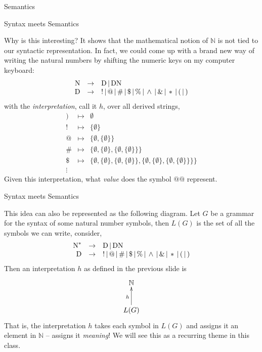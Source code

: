 \documentclass{beamer}
\begin{document}
\begin{frame}{Semantics}

\begin{frame}{Syntax meets Semantics}
\scriptsize

Why is this interesting?  It shows that the mathematical notion of $\mathbb{N}$ is not tied to our syntactic representation.
In fact, we could come up with a brand new way of writing the natural numbers by shifting the numeric keys on my computer keyboard:
\[
\begin{array}{rcl}
\mbox{N} &\rightarrow& \mbox{D} \,|\, \mbox{D}\mbox{N}\\
\mbox{D} &\rightarrow& ! \,|\, @ \,|\, \# \,|\, \$ \,|\, \% \,|\, \wedge \,|\, \& \,|\, * \,|\, ( \,|\, )
\end{array}
\]
with the {\em interpretation}, call it $h$, over all derived strings,
\[
\begin{array}{rcl}
) & \mapsto & \emptyset \\
! & \mapsto & \{\emptyset \} \\
@ & \mapsto & \{ \emptyset , \{\emptyset \} \}\\
\# & \mapsto &\{ \emptyset , \{\emptyset \}, \{ \emptyset , \{\emptyset \} \} \}\\
\$ & \mapsto & \{ \emptyset , \{\emptyset \}, \{ \emptyset , \{\emptyset \} \} , \{ \emptyset , \{\emptyset \}, \{ \emptyset , \{\emptyset \} \} \}\}\\
\vdots
\end{array}
\]
Given this interpretation, what {\em value} does the symbol $@@$ represent.
\end{frame}


\begin{frame}{Syntax meets Semantics}
\small

This idea can also be represented as the following diagram.  Let $G$ be a grammar for the syntax of some natural number symbols,
then $L(G)$ is the set of all the symbols we can write, consider,
{\scriptsize
\[
\begin{array}{rcl}
\mbox{N}^* &\rightarrow& \mbox{D} \,|\, \mbox{D}\mbox{N}\\
\mbox{D} &\rightarrow& ! \,|\, @ \,|\, \# \,|\, \$ \,|\, \% \,|\, \wedge \,|\, \& \,|\, * \,|\, ( \,|\, )
\end{array}
\]
}
Then an interpretation $h$ as defined in the previous slide is
\[
\xymatrix{
\mathbb{N}\\
L(G)\ar[u]^h
}
\]
That is, the interpretation $h$ takes each symbol in $L(G)$ and assigns it an element in $\mathbb{N}$ -- assigns it {\em meaning}!
We will see this as a recurring theme in this class.
\end{frame}


\end{frame}
\end{document}
